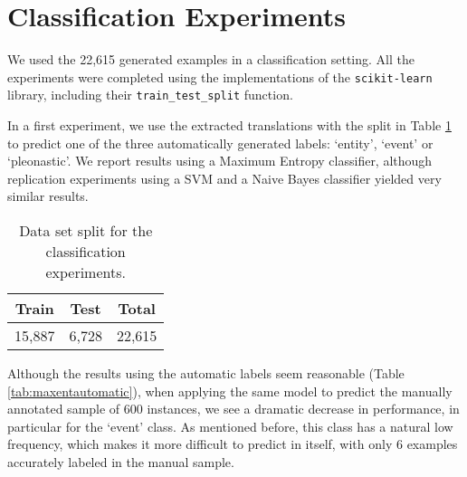 \documentclass[10pt, a4paper]{article}
\begin{document}
\section{Classification Experiments}\label{sec:experiments}

We used the 22,615 generated examples in a classification setting. All the 
experiments were completed using the implementations of the 
\texttt{scikit-learn} library, including their \texttt{train\_test\_split} 
function. 

In a first experiment, we use the extracted translations with the split in Table 
\ref{tab:split} to predict one of the three automatically generated labels: 
`entity', `event' or `pleonastic'. We report results using a Maximum Entropy 
classifier, although replication experiments using a SVM and a Naive Bayes 
classifier yielded very similar results. 


\begin{table}[h!]\centering
\begin{tabular}{ccc}
\toprule
\textbf{Train} & \textbf{Test} & \textbf{Total} \\
\midrule
15,887 & 6,728 & 22,615 \\
\bottomrule
\end{tabular}
\caption{Data set split for the classification experiments.}\label{tab:split}
\end{table}

Although the results using the automatic labels seem reasonable (Table  
\ref{tab:maxentautomatic}), when applying the same model to predict the manually 
annotated sample of 600 instances, we see a dramatic decrease in performance, in 
particular for the `event' class. As mentioned before, this class has a natural 
low frequency, which makes it more 
difficult to predict in itself, with only 6 examples accurately labeled in the manual sample. 
\end{document}
